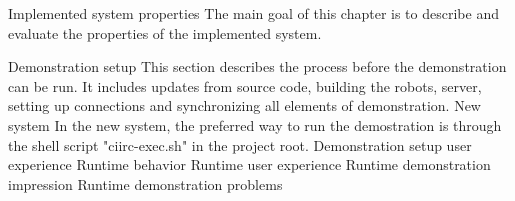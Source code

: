 \chap Implemented system properties
The main goal of this chapter is to describe and evaluate the properties of the implemented system.

\sec Demonstration setup
This section describes the process before the demonstration can be run. It includes updates from source code, building the robots, server, setting up connections and synchronizing all elements of demonstration.
\secc New system
In the new system, the preferred way to run the demostration is through the shell script "ciirc-exec.sh" in the project root.
\sec Demonstration setup user experience
\sec Runtime behavior
\sec Runtime user experience
\sec Runtime demonstration impression
\sec Runtime demonstration problems